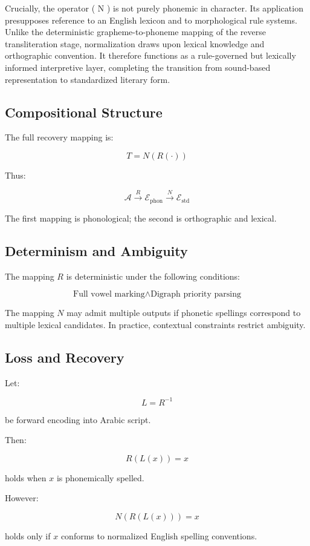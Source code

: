 \documentclass[12pt]{article}
\begin{document}
Crucially, the operator ( N ) is not purely phonemic in character. Its application presupposes reference to an English lexicon and to morphological rule systems. Unlike the deterministic grapheme-to-phoneme mapping of the reverse transliteration stage, normalization draws upon lexical knowledge and orthographic convention. It therefore functions as a rule-governed but lexically informed interpretive layer, completing the transition from sound-based representation to standardized literary form.

\subsection{Compositional Structure}

The full recovery mapping is:

\[
T = N(R(\cdot))
\]

Thus:

\[
\mathcal{A} \xrightarrow{R} \mathcal{E}_{\text{phon}} \xrightarrow{N} \mathcal{E}_{\text{std}}
\]

The first mapping is phonological; the second is orthographic and lexical.

\subsection{Determinism and Ambiguity}

The mapping $R$ is deterministic under the following conditions:

\[
\text{Full vowel marking} \land \text{Digraph priority parsing}
\]

The mapping $N$ may admit multiple outputs if phonetic spellings correspond to multiple lexical candidates. In practice, contextual constraints restrict ambiguity.

\subsection{Loss and Recovery}

Let:

\[
L = R^{-1}
\]

be forward encoding into Arabic script.

Then:

\[
R(L(x)) = x
\]

holds when $x$ is phonemically spelled.

However:

\[
N(R(L(x))) = x
\]

holds only if $x$ conforms to normalized English spelling conventions.
\end{document}
